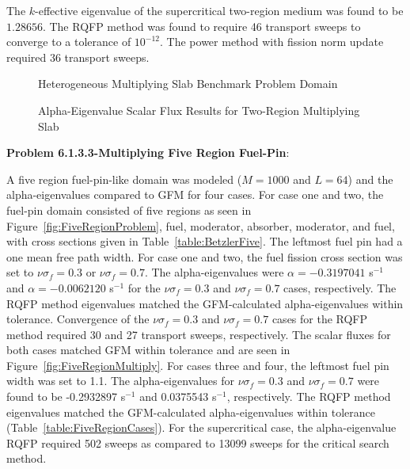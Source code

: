 The $k$-effective eigenvalue of the supercritical two-region medium was found to be $1.28656$. The RQFP method was found to require 46 transport sweeps to converge to a tolerance of $10^{-12}$. The power method with fission norm update required 36 transport sweeps.

\begin{figure}[!htbp]
	\centering
	
	\caption{Heterogeneous Multiplying Slab Benchmark Problem Domain \cite{kornreich_greens_1997}}
	\label{fig:HeteroSlabMult}
\end{figure}

\begin{figure}[!htbp]
	\centering
	\resizebox{0.75\textwidth}{!}{
	
	}
	\caption{Alpha-Eigenvalue Scalar Flux Results for Two-Region Multiplying Slab}
	\label{fig:TwoRegionMultiply}
\end{figure}

\clearpage
\textbf{Problem 6.1.3.3-Multiplying Five Region Fuel-Pin}:

A five region fuel-pin-like domain was modeled ($M=1000$ and $L=64$) and the alpha-eigenvalues compared to GFM for four cases. For case one and two, the fuel-pin domain consisted of five regions as seen in Figure~\ref{fig:FiveRegionProblem}, fuel, moderator, absorber, moderator, and fuel, with cross sections given in Table~\ref{table:BetzlerFive}. The leftmost fuel pin had a one mean free path width. For case one and two, the fuel fission cross section was set to $\nu \sigma_{f} = 0.3$ or $\nu \sigma_{f} = 0.7$. The alpha-eigenvalues were $\alpha = -0.3197041$ s$^{-1}$ and $\alpha = -0.0062120$ s$^{-1}$ for the $\nu \sigma_{f} = 0.3$ and $\nu \sigma_{f} = 0.7$ cases, respectively. The RQFP method eigenvalues matched the GFM-calculated alpha-eigenvalues within tolerance. Convergence of the $\nu \sigma_{f} = 0.3$ and $\nu \sigma_{f} = 0.7$ cases for the RQFP method required 30 and 27 transport sweeps, respectively. The scalar fluxes for both cases matched GFM within tolerance and are seen in Figure~\ref{fig:FiveRegionMultiply}. For cases three and four, the leftmost fuel pin width was set to 1.1. The alpha-eigenvalues for $\nu \sigma_{f} = 0.3$ and $\nu \sigma_{f} = 0.7$ were found to be -0.2932897 s$^{-1}$ and 0.0375543 s$^{-1}$, respectively. The RQFP method eigenvalues matched the GFM-calculated alpha-eigenvalues within tolerance (Table~\ref{table:FiveRegionCases}). For the supercritical case, the alpha-eigenvalue RQFP required 502 sweeps as compared to 13099 sweeps for the critical search method.

